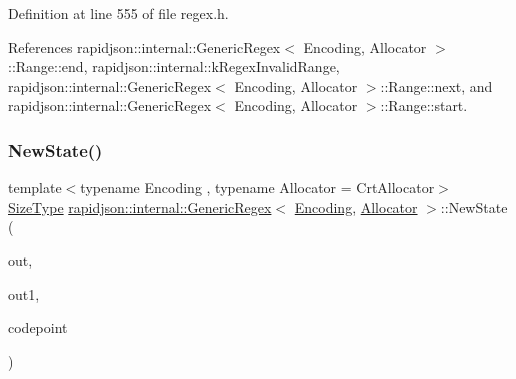 Definition at line 555 of file regex.\+h.


\begin{DoxyCode}{0}

\end{DoxyCode}


References rapidjson\+::internal\+::\+Generic\+Regex$<$ Encoding, Allocator $>$\+::\+Range\+::end, rapidjson\+::internal\+::k\+Regex\+Invalid\+Range, rapidjson\+::internal\+::\+Generic\+Regex$<$ Encoding, Allocator $>$\+::\+Range\+::next, and rapidjson\+::internal\+::\+Generic\+Regex$<$ Encoding, Allocator $>$\+::\+Range\+::start.

\mbox{\label{classrapidjson_1_1internal_1_1_generic_regex_a839d53a5bc8ada62f9fbdb98476b41b9}} 
\subsubsection{\texorpdfstring{NewState()}{NewState()}}
{\footnotesize\ttfamily template$<$typename Encoding , typename Allocator  = Crt\+Allocator$>$ \\
\mbox{\hyperlink{namespacerapidjson_a44eb33eaa523e36d466b1ced64b85c84}{Size\+Type}} \mbox{\hyperlink{classrapidjson_1_1internal_1_1_generic_regex}{rapidjson\+::internal\+::\+Generic\+Regex}}$<$ \mbox{\hyperlink{classrapidjson_1_1_encoding}{Encoding}}, \mbox{\hyperlink{classrapidjson_1_1_allocator}{Allocator}} $>$\+::New\+State (\begin{DoxyParamCaption}\item[{\mbox{\hyperlink{namespacerapidjson_a44eb33eaa523e36d466b1ced64b85c84}{Size\+Type}}}]{out,  }\item[{\mbox{\hyperlink{namespacerapidjson_a44eb33eaa523e36d466b1ced64b85c84}{Size\+Type}}}]{out1,  }\item[{unsigned}]{codepoint }\end{DoxyParamCaption})\hspace{0.3cm}{\ttfamily [private]}}



